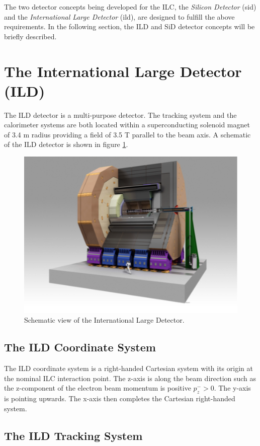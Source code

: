 The two detector concepts being developed for the ILC, the \textit{Silicon Detector} (\acrshort{sid}) and the \textit{International Large Detector} (\acrshort{ild}), are designed to fulfill the above requirements. In the following section, the ILD and SiD detector concepts will be briefly described.

\section{The International Large Detector (ILD)}
\label{sec:ILD}

The ILD detector is a multi-purpose detector. The tracking system and the calorimeter systems are both located within a superconducting solenoid magnet of 3.4 m radius providing a field of 3.5 T parallel to the beam axis. A schematic of the ILD detector is shown in figure \ref{fig:ILD}.

\begin{figure}[htbp!]
  \centering
  \includegraphics[width=0.6\linewidth]{chap2/fig/ILD_full.png}
  \caption{Schematic view of the International Large Detector. \cite{ILC_TDR_Vol4}} \label{fig:ILD}
\end{figure}

\subsection{The ILD Coordinate System}

The ILD coordinate system \cite{ILDCoordinates} is a right-handed Cartesian system with its origin at the nominal ILC interaction point. The z-axis is along the beam direction such as the z-component of the electron beam momentum is positive $p^-_z > 0$. The y-axis is pointing upwards. The x-axis then completes the Cartesian right-handed system.

\subsection{The ILD Tracking System}


